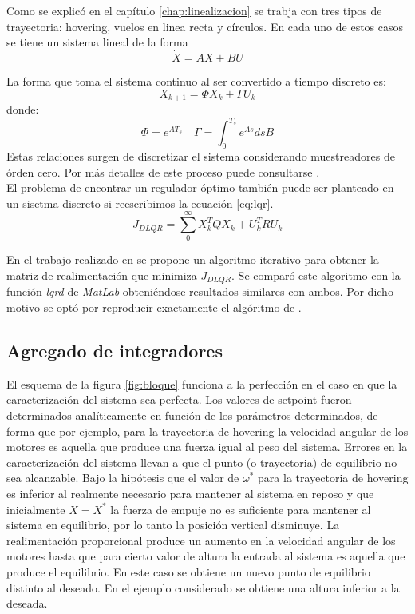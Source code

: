 \documentclass[main]{subfiles}
\begin{document}
Como se explic\'o en el cap\'itulo \ref{chap:linealizacion} se trabja con tres tipos de trayectoria: hovering, vuelos en linea recta y c\'irculos. En cada uno de estos casos se tiene un sistema lineal de la forma 
\begin{equation}
\dot{X} = A X + BU
\end{equation}
 
La forma que toma el sistema continuo al ser convertido a tiempo discreto es: 
\begin{equation}
X_{k+1} = \Phi X_k + \Gamma U_k
\end{equation}
donde:
\begin{equation}
\Phi = e^{AT_s} \quad \Gamma = \int_0^{T_s} e^{A s} ds B
\end{equation}
Estas relaciones surgen de discretizar el sistema considerando muestreadores de \'orden cero. Por m\'as detalles de este proceso puede consultarse \cite{bib:hakas}.\\

El problema de encontrar un regulador \'optimo tambi\'en puede ser planteado en un sisetma discreto si reescribimos la ecuaci\'on \ref{eq:lqr}. 
\begin{equation}
\label{eq:dlqr}
J_{DLQR} = \sum_0^\infty X_k^T Q X_k + U_k^T R U_k
\end{equation}

En el trabajo realizado en \cite{bib:lqr-discreto} se propone un algoritmo iterativo para obtener la matriz de realimentaci\'on que minimiza $J_{DLQR}$. Se compar\'o este algoritmo con la funci\'on \emph{lqrd} de \emph{MatLab} obteni\'endose resultados similares con ambos. Por dicho motivo se opt\'o por reproducir exactamente el alg\'oritmo de \cite{bib:lqr-discreto}.

\subsection{Agregado de integradores}

El esquema de la figura \ref{fig:bloque} funciona a la perfecci\'on en el caso en que la caracterizaci\'on del sistema sea perfecta. Los valores de setpoint fueron determinados anal\'iticamente en funci\'on de los par\'ametros determinados, de forma que por ejemplo, para la trayectoria de hovering la velocidad angular de los motores es aquella que produce una fuerza igual al peso del sistema. Errores en la caracterizaci\'on del sistema llevan a que el punto (o trayectoria) de equilibrio no sea alcanzable. Bajo la hip\'otesis que el valor de $\omega^*$ para la trayectoria de hovering es inferior al realmente necesario para mantener al sistema en reposo y que inicialmente $X = X^*$ la fuerza de empuje no es suficiente para mantener al sistema en equilibrio, por lo tanto la posici\'on vertical disminuye. La realimentaci\'on proporcional produce un aumento en la velocidad angular de los motores hasta que para cierto valor de altura la entrada al sistema es aquella que produce el equilibrio. En este caso se obtiene un nuevo punto de equilibrio distinto al deseado. En el ejemplo considerado se obtiene una altura inferior a la deseada. \\
\end{document}
